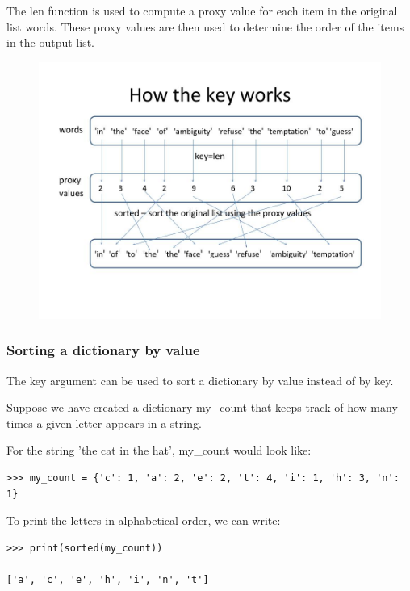 \documentclass{article}
\begin{document}
The len function is used to compute a proxy value for each item in the original list words.  These proxy values are then used to determine the order of the items in the output list.

\begin{figure}[h]
\includegraphics[scale=.36]{sorting_fun}\\
\end{figure}

\subsubsection{Sorting a dictionary by value}

The key argument can be used to sort a dictionary by value instead of by key.

Suppose we have created a dictionary my{\_}count that keeps track of how many times a given letter appears in a string. 

For the string 'the cat in the hat', my{\_}count would look like:

\begin{lstlisting}
>>> my_count = {'c': 1, 'a': 2, 'e': 2, 't': 4, 'i': 1, 'h': 3, 'n': 1}
\end{lstlisting}

To print the letters in alphabetical order, we can write:

\begin{lstlisting}
>>> print(sorted(my_count))

['a', 'c', 'e', 'h', 'i', 'n', 't']
\end{lstlisting}
\end{document}

